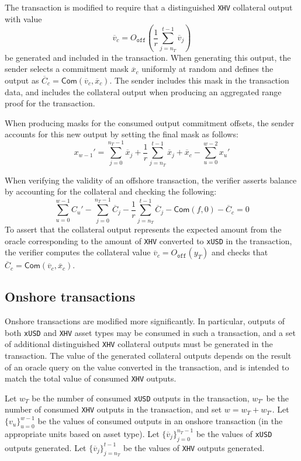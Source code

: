 \documentclass{article}
\newcommand{\ooff}{O_{\texttt{off}}}
\newcommand{\com}{\mathsf{Com}}
\begin{document}
The transaction is modified to require that a distinguished \texttt{XHV} collateral output with value
$$\overline{v}_c = \ooff\left( \frac{1}{r} \sum_{j=n_T}^{t-1} \overline{v}_j \right)$$
be generated and included in the transaction.
When generating this output, the sender selects a commitment mask $\overline{x}_c$ uniformly at random and defines the output as $\overline{C}_c = \com(\overline{v}_c, \overline{x}_c)$.
The sender includes this mask in the transaction data, and includes the collateral output when producing an aggregated range proof for the transaction.

When producing masks for the consumed output commitment offsets, the sender accounts for this new output by setting the final mask as follows:
$$x_{w-1}' = \sum_{j=0}^{n_T-1} \overline{x}_j + \frac{1}{r}\sum_{j=n_T}^{t-1} \overline{x}_j + \overline{x}_c - \sum_{u=0}^{w-2} x_u'$$

When verifying the validity of an offshore transaction, the verifier asserts balance by accounting for the collateral and checking the following:
$$\sum_{u=0}^{w-1} C_u' - \sum_{j=0}^{n_T-1} \overline{C}_j - \frac{1}{r}\sum_{j=n_T}^{t-1} \overline{C}_j - \com(f,0) - \overline{C}_c = 0$$
To assert that the collateral output represents the expected amount from the oracle corresponding to the amount of \texttt{XHV} converted to \texttt{xUSD} in the transaction, the verifier computes the collateral value $\overline{v}_c = \ooff(y_T)$ and checks that $\overline{C}_c = \com(\overline{v}_c, \overline{x}_c)$.


\subsection{Onshore transactions}

Onshore transactions are modified more significantly.
In particular, outputs of both \texttt{xUSD} and \texttt{XHV} asset types may be consumed in such a transaction, and a set of additional distinguished \texttt{XHV} collateral outputs must be generated in the transaction.
The value of the generated collateral outputs depends on the result of an oracle query on the value converted in the transaction, and is intended to match the total value of consumed \texttt{XHV} outputs.

Let $w_T$ be the number of consumed \texttt{xUSD} outputs in the transaction, $w_{T'}$ be the number of consumed \texttt{XHV} outputs in the transaction, and set $w = w_T + w_{T'}$.
Let $\{v_u\}_{u=0}^{w-1}$ be the values of consumed outputs in an onshore transaction (in the appropriate units based on asset type).
Let $\{\overline{v}_j\}_{j=0}^{n_T-1}$ be the values of \texttt{xUSD} outputs generated.
Let $\{\overline{v}_j\}_{j=n_T}^{t-1}$ be the values of \texttt{XHV} outputs generated.
\end{document}
